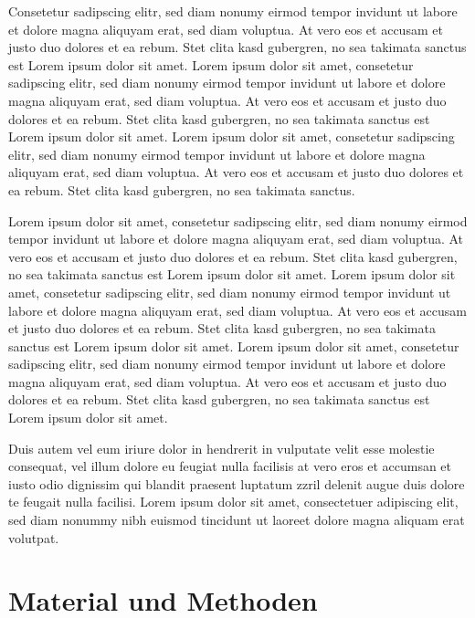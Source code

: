 \documentclass[%
	BCOR12mm, %
	cleardoublepage=empty, %
	tablecaptionabove, %
	toc=bib, %
	toc=listofnumbered, %
	listof=leveldown, %
	numbers=noendperiod %
	]{scrbook}
\begin{document}
Consetetur sadipscing elitr, sed diam nonumy eirmod tempor invidunt ut labore et dolore magna aliquyam erat, sed diam voluptua. At vero eos et accusam et justo duo dolores et ea rebum. Stet clita kasd gubergren, no sea takimata sanctus est Lorem ipsum dolor sit amet. Lorem ipsum dolor sit amet, consetetur sadipscing elitr, sed diam nonumy eirmod tempor invidunt ut labore et dolore magna aliquyam erat, sed diam voluptua. At vero eos et accusam et justo duo dolores et ea rebum. Stet clita kasd gubergren, no sea takimata sanctus est Lorem ipsum dolor sit amet. Lorem ipsum dolor sit amet, consetetur sadipscing elitr, sed diam nonumy eirmod tempor invidunt ut labore et dolore magna aliquyam erat, sed diam voluptua. At vero eos et accusam et justo duo dolores et ea rebum. Stet clita kasd gubergren, no sea takimata sanctus. 

Lorem ipsum dolor sit amet, consetetur sadipscing elitr, sed diam nonumy eirmod tempor invidunt ut labore et dolore magna aliquyam erat, sed diam voluptua. At vero eos et accusam et justo duo dolores et ea rebum. Stet clita kasd gubergren, no sea takimata sanctus est Lorem ipsum dolor sit amet. Lorem ipsum dolor sit amet, consetetur sadipscing elitr, sed diam nonumy eirmod tempor invidunt ut labore et dolore magna aliquyam erat, sed diam voluptua. At vero eos et accusam et justo duo dolores et ea rebum. Stet clita kasd gubergren, no sea takimata sanctus est Lorem ipsum dolor sit amet. Lorem ipsum dolor sit amet, consetetur sadipscing elitr, sed diam nonumy eirmod tempor invidunt ut labore et dolore magna aliquyam erat, sed diam voluptua. At vero eos et accusam et justo duo dolores et ea rebum. Stet clita kasd gubergren, no sea takimata sanctus est Lorem ipsum dolor sit amet. 

Duis autem vel eum iriure dolor in hendrerit in vulputate velit esse molestie consequat, vel illum dolore eu feugiat nulla facilisis at vero eros et accumsan et iusto odio dignissim qui blandit praesent luptatum zzril delenit augue duis dolore te feugait nulla facilisi. Lorem ipsum dolor sit amet, consectetuer adipiscing elit, sed diam nonummy nibh euismod tincidunt ut laoreet dolore magna aliquam erat volutpat.



\chapter{Material und Methoden} %
\label{cha:material_und_methoden}
\end{document}
